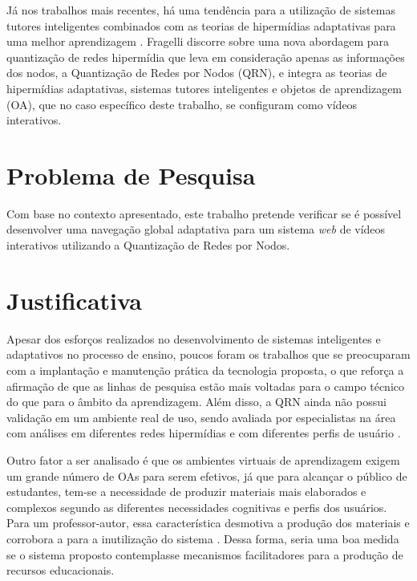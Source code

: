 Já nos trabalhos mais recentes, há uma tendência para a utilização de sistemas tutores inteligentes combinados com as teorias de hipermídias adaptativas para uma melhor aprendizagem \cite{fragelli2010}. Fragelli discorre sobre uma nova abordagem para quantização de redes hipermídia que leva em consideração apenas as informações dos nodos, a Quantização de Redes por Nodos (QRN), e integra as teorias de hipermídias adaptativas, sistemas tutores inteligentes e objetos de aprendizagem (OA), que no caso específico deste trabalho, se configuram como vídeos interativos.

\section[Problema de Pesquisa]{Problema de Pesquisa}

Com base no contexto apresentado, este trabalho pretende verificar se é possível desenvolver uma navegação global adaptativa para um sistema \textit{web} de vídeos interativos utilizando a Quantização de Redes por Nodos.

\section[Justificativa]{Justificativa}

Apesar dos esforços realizados no desenvolvimento de sistemas inteligentes e adaptativos no processo de ensino, poucos foram os trabalhos que se preocuparam com a implantação e manutenção prática da tecnologia proposta, o que reforça a afirmação de que as linhas de pesquisa estão mais voltadas para o campo técnico do que para o âmbito da aprendizagem. Além disso, a QRN ainda não possui validação em um ambiente real de uso, sendo avaliada por especialistas na área com análises em diferentes redes hipermídias e com diferentes perfis de usuário \cite{fragelli2010}.

Outro fator a ser analisado é que os ambientes virtuais de aprendizagem exigem um grande número de OAs para serem efetivos, já que para alcançar o público de estudantes, tem-se a necessidade de produzir materiais mais elaborados e complexos segundo as diferentes necessidades cognitivas e perfis dos usuários. Para um professor-autor, essa característica desmotiva a produção dos materiais e corrobora a para a inutilização do sistema \cite{fragelli2010}. Dessa forma, seria uma boa medida se o sistema proposto contemplasse mecanismos facilitadores para a produção de recursos educacionais.

